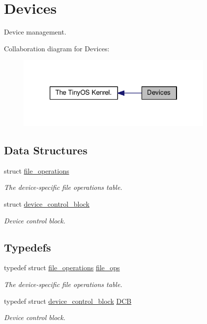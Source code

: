 \hypertarget{group__dev}{\section{Devices}
\label{group__dev}
}


Device management.  


Collaboration diagram for Devices\-:
\nopagebreak
\begin{figure}[H]
\begin{center}
\leavevmode
\includegraphics[width=274pt]{group__dev}
\end{center}
\end{figure}
\subsection*{Data Structures}
\begin{DoxyCompactItemize}
\item 
struct \hyperlink{structfile__operations}{file\-\_\-operations}
\begin{DoxyCompactList}\small\item\em The device-\/specific file operations table. \end{DoxyCompactList}\item 
struct \hyperlink{structdevice__control__block}{device\-\_\-control\-\_\-block}
\begin{DoxyCompactList}\small\item\em Device control block. \end{DoxyCompactList}\end{DoxyCompactItemize}
\subsection*{Typedefs}
\begin{DoxyCompactItemize}
\item 
typedef struct \hyperlink{structfile__operations}{file\-\_\-operations} \hyperlink{group__dev_gaab625d8ae3a95e942ed10ed1579f5042}{file\-\_\-ops}
\begin{DoxyCompactList}\small\item\em The device-\/specific file operations table. \end{DoxyCompactList}\item 
typedef struct \hyperlink{structdevice__control__block}{device\-\_\-control\-\_\-block} \hyperlink{group__dev_gaf0e2d4a982667466d84f6fb7522611d6}{D\-C\-B}
\begin{DoxyCompactList}\small\item\em Device control block. \end{DoxyCompactList}\end{DoxyCompactItemize}
